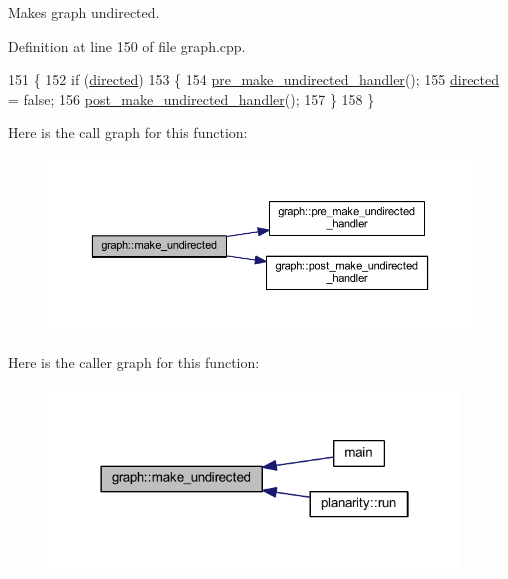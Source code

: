 Makes graph undirected. 

Definition at line 150 of file graph.\+cpp.


\begin{DoxyCode}
151 \{
152     \textcolor{keywordflow}{if} (\mbox{\hyperlink{classgraph_ab4120df210eb3d03d20b0bd27f8cbe8c}{directed}})
153     \{
154     \mbox{\hyperlink{classgraph_a8964107991e6f411ba8992f6b1deda21}{pre\_make\_undirected\_handler}}();
155     \mbox{\hyperlink{classgraph_ab4120df210eb3d03d20b0bd27f8cbe8c}{directed}} = \textcolor{keyword}{false};
156     \mbox{\hyperlink{classgraph_a3d2bc348d12931aff1d2e97a6b4285c3}{post\_make\_undirected\_handler}}();
157     \}
158 \}
\end{DoxyCode}
Here is the call graph for this function\+:
\nopagebreak
\begin{figure}[H]
\begin{center}
\leavevmode
\includegraphics[width=350pt]{classgraph_a31c8b895bd842f1b9dcc67649956cfc7_cgraph}
\end{center}
\end{figure}
Here is the caller graph for this function\+:
\nopagebreak
\begin{figure}[H]
\begin{center}
\leavevmode
\includegraphics[width=310pt]{classgraph_a31c8b895bd842f1b9dcc67649956cfc7_icgraph}
\end{center}
\end{figure}
\mbox{\label{classgraph_a02a0c3a219f75d68caa408ef339d4a1c}} 
